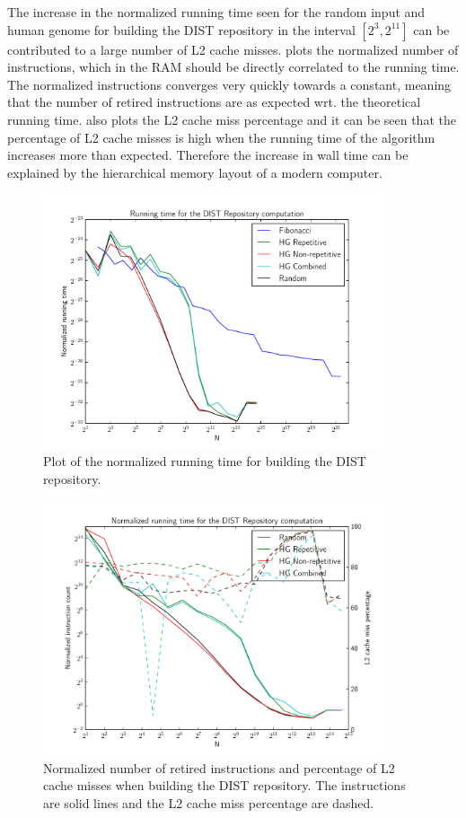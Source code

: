 \documentclass[twoside,11pt,openright]{report}
\begin{document}
The increase in the normalized running time seen for the random input and human genome for building the DIST repository in the interval $[2^3,2^11]$ can be contributed to a large number of L2 cache misses.  plots the normalized number of instructions, which in the RAM should be directly correlated to the running time. The normalized instructions converges very quickly towards a constant, meaning that the number of retired instructions are as expected wrt. the theoretical running time.  also plots the L2 cache miss percentage and it can be seen that the percentage of L2 cache misses is high when the running time of the algorithm increases more than expected. Therefore the increase in wall time can be explained by the hierarchical memory layout of a modern computer.

\begin{figure}[!htb]
  \centering
  \includegraphics[width=10cm]{combined/dist_runningtime}
  \caption{Plot of the normalized running time for building the DIST repository.}
  \label{fig:benchmark:dist-repo-time}
\end{figure}

\begin{figure}[!htb]
  \centering
  \includegraphics[width=10cm]{combined/dist_runningtime_cpu}
  \caption{Normalized number of retired instructions and percentage of L2 cache misses when building the DIST repository. The instructions are solid lines and the L2 cache miss percentage are dashed.}
  \label{fig:benchmark:dist-repo-cpu}
\end{figure}
\end{document}
